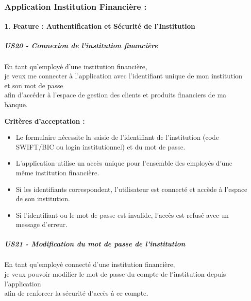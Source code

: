 \hypertarget{application-institution-financiuxe8re}{%
\subsubsection{Application Institution Financière
:}\label{application-institution-financiuxe8re}}

\hypertarget{feature-authentification-et-suxe9curituxe9-de-linstitution}{%
\paragraph{1. Feature : Authentification et Sécurité de
l'Institution}\label{feature-authentification-et-suxe9curituxe9-de-linstitution}}

\hypertarget{us20---connexion-de-linstitution-financiuxe8re}{%
\subparagraph{US20 - Connexion de l'institution
financière}\label{us20---connexion-de-linstitution-financiuxe8re}}

En tant qu'employé d'une institution financière,\\
je veux me connecter à l'application avec l'identifiant unique de mon
institution et son mot de passe\\
afin d'accéder à l'espace de gestion des clients et produits financiers
de ma banque.

\textbf{Critères d'acceptation :}

\begin{itemize}
\tightlist
\item
  Le formulaire nécessite la saisie de l'identifiant de l'institution
  (code SWIFT/BIC ou login institutionnel) et du mot de passe.
\item
  L'application utilise un accès unique pour l'ensemble des employés
  d'une même institution financière.
\item
  Si les identifiants correspondent, l'utilisateur est connecté et
  accède à l'espace de son institution.
\item
  Si l'identifiant ou le mot de passe est invalide, l'accès est refusé
  avec un message d'erreur.
\end{itemize}

\hypertarget{us21---modification-du-mot-de-passe-de-linstitution}{%
\subparagraph{US21 - Modification du mot de passe de
l'institution}\label{us21---modification-du-mot-de-passe-de-linstitution}}

En tant qu'employé connecté d'une institution financière,\\
je veux pouvoir modifier le mot de passe du compte de l'institution
depuis l'application\\
afin de renforcer la sécurité d'accès à ce compte.

